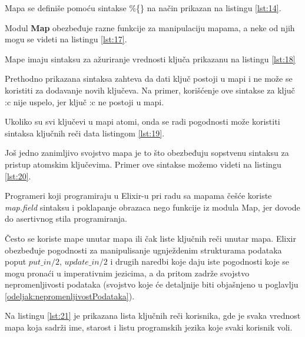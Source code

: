\documentclass[12pt,oneside]{memoir}
\begin{document}
Mapa se definiše pomoću sintakse \%\{\} na način prikazan na listingu \ref{lst:14}.



Modul \textbf{Map} obezbeđuje razne funkcije za manipulaciju mapama, a neke od njih mogu se videti na listingu \ref{lst:17}.



Mape imaju sintaksu za ažuriranje vrednosti ključa prikazanu na listingu \ref{lst:18}



\noindent Prethodno prikazana sintaksa zahteva da dati ključ postoji u mapi i ne može se koristiti za dodavanje novih ključeva. Na primer, korišćenje ove sintakse za ključ :c nije uspelo, jer ključ :c ne postoji u mapi.



Ukoliko su svi ključevi u mapi atomi, onda se radi pogodnosti može koristiti sintaksa ključnih reči data listingom \ref{lst:19}.



Još jedno zanimljivo svojstvo mapa je to što obezbeđuju sopstvenu sintaksu za pristup atomskim ključevima. Primer ove sintakse možemo videti na listingu \ref{lst:20}.



\noindent Programeri koji programiraju u Elixir-u pri radu sa mapama češće koriste \textit{map.field} sintaksu i poklapanje obrazaca nego funkcije iz modula Map, jer dovode do asertivnog stila programiranja.

Često se koriste mape unutar mapa ili čak liste ključnih reči unutar mapa. Elixir obezbeđuje pogodnosti za manipulisanje ugnježdenim strukturama podataka poput $put\_in/2$, $update\_in/2$ i drugih naredbi koje daju iste pogodnosti koje se mogu pronaći u imperativnim jezicima, a da pritom zadrže svojstvo nepromenljivosti podataka (svojstvo koje će detaljnije biti objašnjeno u poglavlju \ref{odeljak:nepromenljivostPodataka}).

Na listingu \ref{lst:21} je prikazana lista ključnih reči korisnika, gde je svaka vrednost mapa koja sadrži ime, starost i listu programskih jezika koje svaki korisnik voli.
\end{document}
